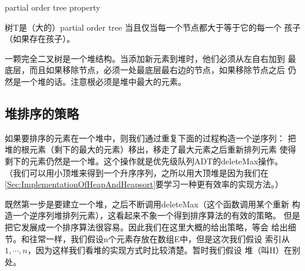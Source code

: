 \begin{definition}
partial order tree property

树T是（大的）partial order tree 当且仅当每一个节点都大于等于它的每一个
孩子（如果存在孩子）。
\end{definition}

一颗完全二叉树是一个堆结构。当添加新元素到堆时，他们必须从左自右加到
最底层，而且如果移除节点，必须一处最底层最右边的节点，如果移除节点之后
仍然是一个堆的话。注意根必须是堆中最大的元素。

\subsection{堆排序的策略}
如果要排序的元素在一个堆中，则我们通过重复下面的过程构造一个逆序列：
把堆的根元素（剩下的最大的元素）移出，移走了最大元素之后重新排列元素
使得剩下的元素仍然是一个堆。这个操作就是优先级队列ADT的deleteMax操作。
（我们可以用小顶堆来得到一个升序序列，之所以用大顶堆是因为我们在
\ref{Sec:ImplementationOfHeapAndHeapsort}要学习一种更有效率的实现方法。）

既然第一步是要建立一个堆，之后不断调用deleteMax（这个函数调用某个重新
构造一个逆序列堆排列元素），这看起来不象一个得到排序算法的有效的策略。
但是把它发展成一个排序算法很容易。因此我们在这里大概的给出策略，等会
给出细节。和往常一样，我们假设n个元素存放在数组E中，但是这次我们假设
索引从$1, \cdots,n$，因为这样我们看堆的实现方式时比较清楚。暂时我们假设
堆（叫H）在别处。

